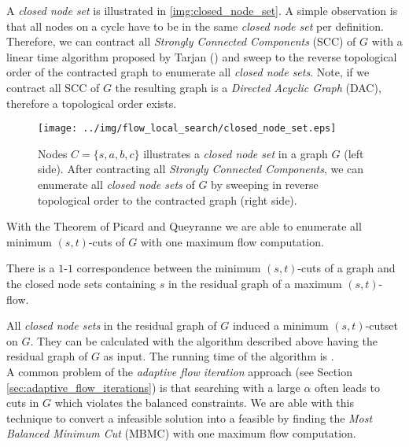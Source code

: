 A \emph{closed node set} is illustrated in \autoref{img:closed_node_set}. A simple observation
is that all nodes on a cycle have to be in the same \emph{closed node set} per definition. Therefore,
we can contract all \emph{Strongly Connected Components} (SCC) of $G$ with a linear time algorithm
proposed by Tarjan () and sweep to the reverse
topological order of the contracted graph to enumerate all \emph{closed node sets}. Note, if
we contract all SCC of $G$ the resulting graph is a \emph{Directed Acyclic Graph} (DAC), therefore 
a topological order exists.
\begin{figure}
\centering
\texttt{[image: ../img/flow\_local\_search/closed\_node\_set.eps]}
\caption{Nodes $C = \{s,a,b,c\}$ illustrates a \emph{closed node set} in a graph $G$ (left side).
         After contracting all \emph{Strongly Connected Components}, we can enumerate all
         \emph{closed node sets} of $G$ by sweeping in reverse topological order to the
         contracted graph (right side).}
\label{img:closed_node_set}
\end{figure}
With the Theorem of Picard and Queyranne \cite{picard1980structure} we are able to enumerate
all minimum $(s,t)$-cuts of $G$ with one maximum flow computation.

\begin{theorem}
\label{theorem:mbmc}
There is a $1$-$1$ correspondence between the minimum $(s,t)$-cuts of a graph and the closed node
sets containing $s$ in the residual graph of a maximum $(s,t)$-flow.
\end{theorem}

All \emph{closed node sets} in the residual graph of $G$ induced a minimum $(s,t)$-cutset on $G$.
They can be calculated with the algorithm described above having the residual graph of
$G$ as input. The running time of the algorithm is . \\
A common problem of the \emph{adaptive flow iteration} approach (see Section \ref{sec:adaptive_flow_iterations}) is
that searching with a large $\alpha$ often leads to cuts in $G$ which violates the balanced constraints. 
We are able with this technique to convert a infeasible solution into a feasible by finding
the \emph{Most Balanced Minimum Cut} (MBMC) with one maximum flow computation.



